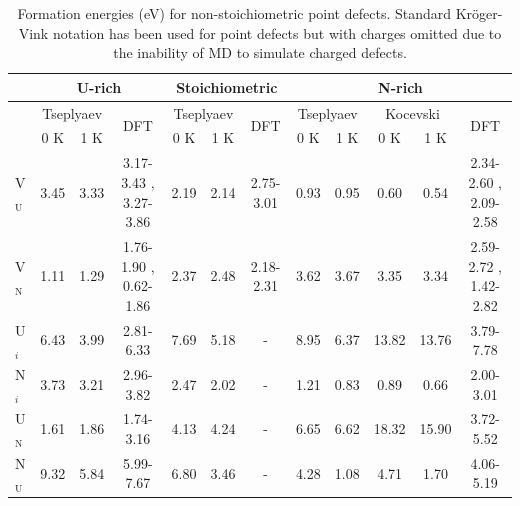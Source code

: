 \documentclass[preprint, 12pt]{elsarticle}
\begin{document}
\begin{table}[h!]
\tiny 
\centering
\caption{Formation energies (eV) for non-stoichiometric point defects. Standard Kröger-Vink notation \cite{Kroger1956} has been used for point defects but with charges omitted due to the inability of MD to simulate charged defects.}
\begin{tabular}{l|cc|c|cc|c|cc|cc|c}
\hline
& \multicolumn{3}{c|}{U-rich} & \multicolumn{3}{c|}{Stoichiometric} & \multicolumn{5}{c}{N-rich} \\
\hline
& \multicolumn{2}{c|}{Tseplyaev} & \multirow{2}{*}{DFT} & \multicolumn{2}{c|}{Tseplyaev} & \multirow{2}{*}{DFT} & \multicolumn{2}{c|}{Tseplyaev} & \multicolumn{2}{c|}{Kocevski} & \multirow{2}{*}{DFT} \\
& 0 K & 1 K                &                      & 0 K & 1 K                &                      & 0 K & 1 K                & 0 K & 1 K & \\  
\hline
V$_\text{U}$ & 3.45            & 3.33            & 3.17-3.43 \cite{Yang2021}, 3.27-3.86  \cite{Kocevski2022I} & 2.19            & 2.14            & 2.75-3.01 \cite{Yang2021} & 0.93            & 0.95            & 0.60             & 0.54  & 2.34-2.60 \cite{Yang2021}, 2.09-2.58  \cite{Kocevski2022I} \\
V$_\text{N}$ & 1.11            & 1.29            & 1.76-1.90 \cite{Yang2021}, 0.62-1.86  \cite{Kocevski2022I} & 2.37            & 2.48            & 2.18-2.31 \cite{Yang2021} & 3.62            & 3.67            & 3.35             & 3.34  & 2.59-2.72 \cite{Yang2021}, 1.42-2.82  \cite{Kocevski2022I} \\
U$_i$ & 6.43            & 3.99            & 2.81-6.33 \cite{Kocevski2022I}                             & 7.69            & 5.18            & -                         & 8.95            & 6.37            & 13.82            & 13.76 & 3.79-7.78  \cite{Kocevski2022I} \\
N$_i$ & 3.73            & 3.21            & 2.96-3.82 \cite{Kocevski2022I}                             & 2.47            & 2.02            & -                         & 1.21            & 0.83            & 0.89             & 0.66  & 2.00-3.01  \cite{Kocevski2022I} \\
U$_\text{N}$ & 1.61            & 1.86            & 1.74-3.16 \cite{Kocevski2022I}                             & 4.13            & 4.24            & -                         & 6.65            & 6.62            & 18.32            & 15.90 & 3.72-5.52  \cite{Kocevski2022I} \\
N$_\text{U}$ & 9.32            & 5.84            & 5.99-7.67 \cite{Kocevski2022I}                             & 6.80            & 3.46            & -                         & 4.28            & 1.08            & 4.71             & 1.70  & 4.06-5.19  \cite{Kocevski2022I} \\
\hline
\end{tabular}
\label{Tab:Ef}
\end{table}
\end{document}
